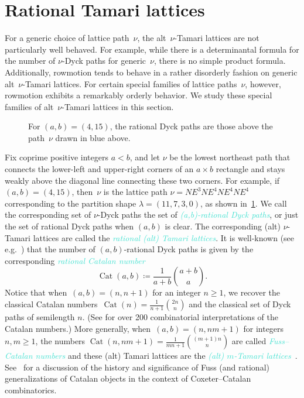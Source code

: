 \documentclass[11pt]{amsart}
\newcounter{width}
\DeclareMathOperator{\cat}{Cat}
\newcommand{\dfn}[1]{\textcolor{Turquoise}{\emph{#1}}}
\theoremstyle{definition}
\begin{document}
\section{Rational Tamari lattices} \label{sec:rational}

For a generic choice of lattice path~$\nu$, the alt~$\nu$-Tamari lattices are not particularly well behaved. For example, while there is a determinantal formula for the number of $\nu$-Dyck paths for generic~$\nu$, there is no simple product formula. Additionally, rowmotion tends to behave in a rather disorderly fashion on generic alt~$\nu$-Tamari lattices. For certain special families of lattice paths~$\nu$, however, rowmotion exhibits a remarkably orderly behavior. We study these special families of alt~$\nu$-Tamari lattices in this section.


\begin{figure}[ht]
\begin{center}
\end{center}
\caption{For $(a,b)=(4,15)$, the rational Dyck paths are those above the path~$\nu$ drawn in blue above.}
\label{fig:rat_path_ex}
\end{figure}
 
Fix coprime positive integers $a < b$, and let $\nu$ be the lowest northeast path that connects the lower-left and upper-right corners of an $a\times b$ rectangle and stays weakly above the diagonal line connecting these two corners. 
For example, if~$(a,b)=(4,15)$, then~$\nu$ is the lattice path $\nu = NE^3NE^4NE^4NE^4$ corresponding to the partition shape $\lambda=(11,7,3,0)$, as shown in~\cref{fig:rat_path_ex}. We call the corresponding set of $\nu$-Dyck paths the set of \dfn{(a,b)-rational Dyck paths}, or just the set of rational Dyck paths when $(a,b)$ is clear. The corresponding (alt) $\nu$-Tamari lattices are called the \dfn{rational (alt) Tamari lattices}. It is well-known (see e.g.~\cite{bizley1954longtitle}) that the number of $(a,b)$-rational Dyck paths is given by the corresponding \dfn{rational Catalan number}
\[\cat(a,b) \coloneqq \frac{1}{a+b}\binom{a+b}{a}.\]
Notice that when~$(a,b)=(n,n+1)$ for an integer $n\geq 1$, we recover the classical Catalan numbers~$\cat(n) = \frac{1}{n+1}\binom{2n}{n}$ and the classical set of Dyck paths of semilength $n$. (See \cite{stanley2015catalan} for over 200 combinatorial interpretations of the Catalan numbers.) More generally, when~$(a,b)=(n,nm+1)$ for integers $n,m\geq 1$, the numbers $\cat(n,nm+1)=\frac{1}{mn+1}\binom{(m+1)n}{n}$ are called \dfn{Fuss--Catalan numbers} and these (alt) Tamari lattices are the \dfn{(alt) $m$-Tamari lattices}~\cite{bergeron2012higher}. See~\cite[Chapter~1]{stump2025cataland} for a discussion of the history and significance of Fuss (and rational) generalizations of Catalan objects in the context of Coxeter--Catalan combinatorics.
\end{document}
